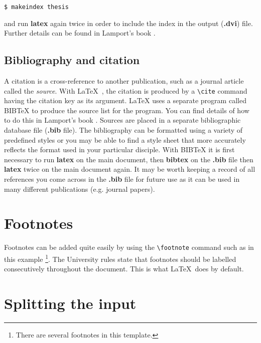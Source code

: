\documentclass[11pt,oneside]{book}
\begin{document}
\begin{verbatim}
$ makeindex thesis
\end{verbatim}

and run {\bf latex} again twice in order to include the index in the output
({\bf .dvi}) file. Further details can be found in Lamport's book \cite{latex}.


\subsection{Bibliography and citation}
A citation is a cross-reference to another publication, such as a journal
article called the {\em source}. With \LaTeX \ , the citation is produced
by a \verb+\cite+ command having the citation key as its argument. \LaTeX
uses a separate program called BIBTeX to produce the source list for the
program. You can find details of how to do this in Lamport's book \cite{latex}.
Sources are placed in a separate bibliographic database file ({\bf .bib} file).
The bibliography can be formatted using a variety of predefined styles or you may
be able to find a style sheet that more accurately reflects the format
used in your particular disciple. With BIBTeX it is first necessary to
run {\bf latex} on the main document, then {\bf bibtex} on the {\bf .bib} file
then {\bf latex} twice on the main document again. It may be worth keeping a record
of all references you come across in the {\bf .bib} file for future use as it
can be used in many different publications (e.g. journal papers).

\section{Footnotes}
Footnotes can be added quite easily by using the \verb+\footnote+ command
such as in this example \footnote{There are several footnotes in this template.}.
The University rules state that footnotes should be labelled consecutively
throughout the document. This is what \LaTeX \ does by default.

\section{Splitting the input}
\end{document}
